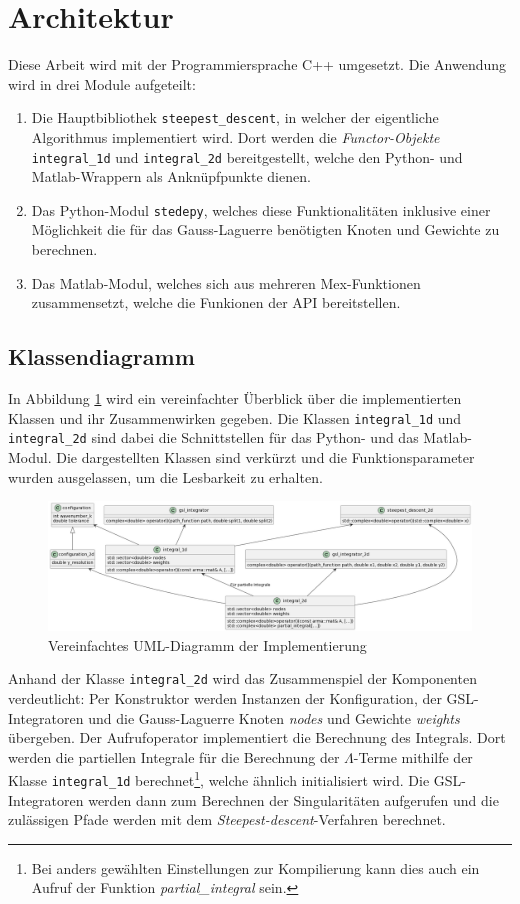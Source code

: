 \section{Architektur}

Diese Arbeit wird mit der Programmiersprache C++ umgesetzt.
Die Anwendung wird in drei Module aufgeteilt:
\begin{enumerate}
    \item Die Hauptbibliothek \texttt{steepest\_descent}, in welcher der eigentliche Algorithmus implementiert wird. Dort werden die \textit{Functor-Objekte} \texttt{integral\_1d} und \texttt{integral\_2d} bereitgestellt,
    welche den Python- und Matlab-Wrappern als Anknüpfpunkte dienen. 
    \item Das Python-Modul \texttt{stedepy}, welches diese Funktionalitäten inklusive einer Möglichkeit die für das Gauss-Laguerre benötigten Knoten und Gewichte zu berechnen.
    \item Das Matlab-Modul, welches sich aus mehreren Mex-Funktionen zusammensetzt, welche die Funkionen der API bereitstellen.
\end{enumerate}

\subsection{Klassendiagramm}

In Abbildung \ref{uml} wird ein vereinfachter Überblick über die implementierten Klassen und ihr Zusammenwirken gegeben.
Die Klassen \texttt{integral\_1d} und \texttt{integral\_2d} sind dabei die Schnittstellen für das Python- und das Matlab-Modul.
Die dargestellten Klassen sind verkürzt und die Funktionsparameter wurden ausgelassen, um die Lesbarkeit zu erhalten.

\begin{figure}
    \includegraphics[width=\textwidth]{images/uml.png}
    \caption{Vereinfachtes UML-Diagramm der Implementierung}\label{uml}
\end{figure}

Anhand der Klasse \texttt{integral\_2d} wird das Zusammenspiel der Komponenten verdeutlicht:
Per Konstruktor werden Instanzen der Konfiguration, der GSL-Integratoren und die Gauss-Laguerre Knoten \textit{nodes} und Gewichte \textit{weights} übergeben.
Der Aufrufoperator implementiert die Berechnung des Integrals. Dort werden die partiellen Integrale für die Berechnung der $\Lambda$-Terme mithilfe der Klasse
\texttt{integral\_1d} berechnet\footnote{Bei anders gewählten Einstellungen zur Kompilierung kann dies auch ein Aufruf der Funktion \textit{partial\_integral} sein.}, welche ähnlich initialisiert wird. Die GSL-Integratoren werden dann zum Berechnen der Singularitäten aufgerufen und die zulässigen Pfade werden mit 
dem \textit{Steepest-descent}-Verfahren berechnet. 

